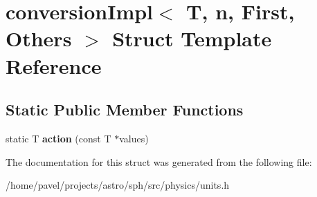 \hypertarget{structconversionImpl}{}\section{conversion\+Impl$<$ T, n, First, Others $>$ Struct Template Reference}
\label{structconversionImpl}
\subsection*{Static Public Member Functions}
\begin{DoxyCompactItemize}
\item 
\hypertarget{structconversionImpl_a9dc4103559ed610eba2102933a9277da}{}\label{structconversionImpl_a9dc4103559ed610eba2102933a9277da} 
static T {\bfseries action} (const T $\ast$values)
\end{DoxyCompactItemize}


The documentation for this struct was generated from the following file\+:\begin{DoxyCompactItemize}
\item 
/home/pavel/projects/astro/sph/src/physics/units.\+h\end{DoxyCompactItemize}
